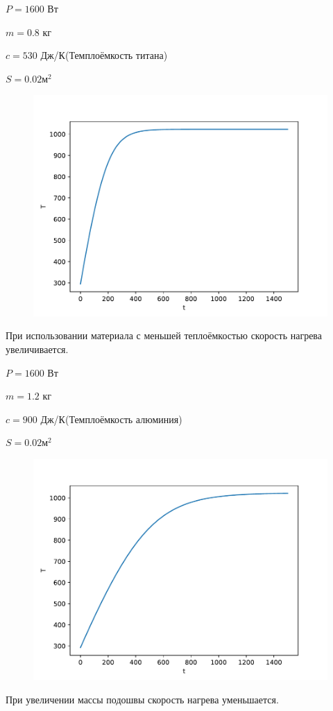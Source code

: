\documentclass[a4paper, 14pt]{extarticle}
\begin{document}
			$P = 1600$ Вт
			
			$m = 0.8$ кг
			
			$c = 530$ Дж/К(Темплоёмкость титана)
			
			$S = 0.02 \text{м}^2$
			
			\begin{figure}[H]
				\centering
				\includegraphics[width = \linewidth]{fig2.pdf}
				\caption[.] {}
			\end{figure}
			При использовании материала с меньшей теплоёмкостью скорость нагрева увеличивается.
			\pagebreak
			
			$P = 1600$ Вт
			
			$m = 1.2$ кг
			
			$c = 900$ Дж/К(Темплоёмкость алюминия)
			
			$S = 0.02 \text{м}^2$
			
			\begin{figure}[H]
				\centering
				\includegraphics[width = \linewidth]{fig3.pdf}
				\caption[.] {}
			\end{figure}
			При увеличении массы подошвы скорость нагрева уменьшается.
			\pagebreak
			
\end{document}
